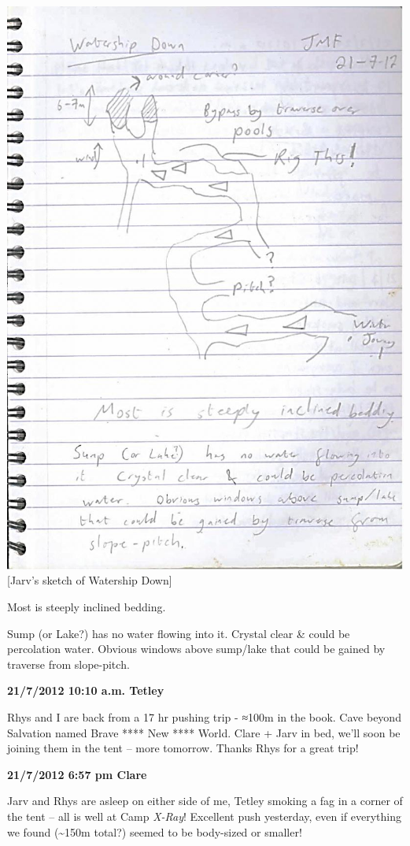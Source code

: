 \includegraphics{UgLog1012/63.jpeg}\\
{[}Jarv's sketch of Watership Down{]}

Most is steeply inclined bedding.

Sump (or Lake?) has no water flowing into it. Crystal clear \& could be
percolation water. Obvious windows above sump/lake that could be gained
by traverse from slope-pitch.

\textbf{21/7/2012 10:10 a.m. Tetley}

Rhys and I are back from a 17 hr pushing trip - ≈100m in the book. Cave
beyond Salvation named Brave **** New **** World. Clare + Jarv in bed,
we'll soon be joining them in the tent -- more tomorrow. Thanks Rhys for
a great trip!

\textbf{21/7/2012 6:57 pm Clare}

Jarv and Rhys are asleep on either side of me, Tetley smoking a fag in a
corner of the tent -- all is well at Camp \emph{X-Ray}! Excellent push
yesterday, even if everything we found (\textasciitilde{}150m total?)
seemed to be body-sized or smaller!

